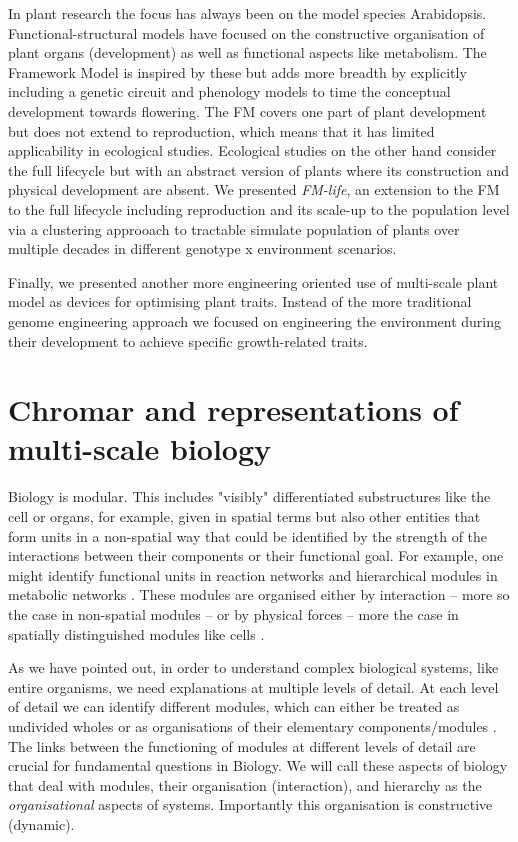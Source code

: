 \documentclass[phd]{infthesis}
\begin{document}
In plant research the focus has always been on the model species
Arabidopsis. Functional-structural models have focused on the constructive
organisation of plant organs (development) as well as functional aspects like
metabolism. The Framework Model is inspired by these but adds more breadth by
explicitly including a genetic circuit and phenology models to time the
conceptual development towards flowering. The FM covers one part of plant
development but does not extend to reproduction, which means that it has limited
applicability in ecological studies. Ecological studies on the other hand
consider the full lifecycle but with an abstract version of plants where its
construction and physical development are absent. We presented \emph{FM-life},
an extension to the FM to the full lifecycle including reproduction and its
scale-up to the population level via a clustering approoach to tractable
simulate population of plants over multiple decades in different genotype x
environment scenarios.

Finally, we presented another more engineering oriented use of multi-scale plant
model as devices for optimising plant traits. Instead of the more traditional
genome engineering approach we focused on engineering the environment during
their development to achieve specific growth-related traits.


\section{Chromar and representations of multi-scale biology}
Biology is modular. This includes "visibly" differentiated substructures like
the cell or organs, for example, given in spatial terms but also other entities
that form units in a non-spatial way that could be identified by the strength of
the interactions between their components or their functional goal. For example,
one might identify functional units in reaction networks
\citep{ederer_approach_2003} and hierarchical modules in metabolic networks
\citep{ravasz_hierarchical_2002}. These modules are organised either by
interaction -- more so the case in non-spatial modules -- or by physical forces
-- more the case in spatially distinguished modules like cells
\citep['Biological and Physical systems' section]{simon1962architecture}.

As we have pointed out, in order to understand complex biological systems, like
entire organisms, we need explanations at multiple levels of detail. At each
level of detail we can identify different modules, which can either be treated
as undivided wholes or as organisations of their elementary components/modules
\citep{varela_autopoiesis:_1974}. The links between the functioning of modules
at different levels of detail are crucial for fundamental questions in
Biology. We will call these aspects of biology that deal with modules, their
organisation (interaction), and hierarchy as the \emph{organisational} aspects
of systems. Importantly this organisation is constructive (dynamic).
\end{document}
